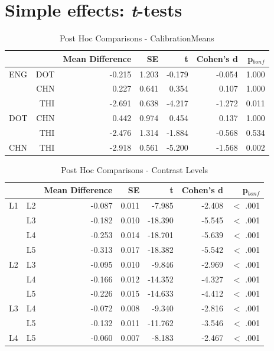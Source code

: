 \section{Simple effects: \textit{t}-tests}
\label{Appendix:ttests}

\begin{table}[ht]
	\centering
	\caption{Post Hoc Comparisons - CalibrationMeans}
	\begin{tabular}{lrrrrrr}
		\hline
		 &  & Mean Difference & SE & t & Cohen's d & p$_{bonf}$  \\
		\hline
		ENG & DOT & -0.215 & 1.203 & -0.179 & -0.054 & 1.000  \\
		  & CHN & 0.227 & 0.641 & 0.354 & 0.107 & 1.000  \\
		 & THI & -2.691 & 0.638 & -4.217 & -1.272 & 0.011  \\
		DOT & CHN & 0.442 & 0.974 & 0.454 & 0.137 & 1.000  \\
		  & THI & -2.476 & 1.314 & -1.884 & -0.568 & 0.534  \\
		CHN & THI & -2.918 & 0.561 & -5.200 & -1.568 & 0.002  \\
		\hline
	\end{tabular} 
	\label{tab:ttest_CalibrationMean_Cross}
\end{table}

\begin{table}[ht]
	\centering
	\caption{Post Hoc Comparisons - Contrast Levels}
	\begin{tabular}{lrrrrrr}
		\hline
		 &  & Mean Difference & SE & t & Cohen's d & p$_{bonf}$  \\
		\hline
		L1 & L2 & -0.087 & 0.011 & -7.985 & -2.408 & $<$ .001  \\
		  & L3 & -0.182 & 0.010 & -18.390 & -5.545 & $<$ .001  \\
		 & L4 & -0.253 & 0.014 & -18.701 & -5.639 & $<$ .001  \\
		 & L5 & -0.313 & 0.017 & -18.382 & -5.542 & $<$ .001  \\
		L2 & L3 & -0.095 & 0.010 & -9.846 & -2.969 & $<$ .001  \\
		  & L4 & -0.166 & 0.012 & -14.352 & -4.327 & $<$ .001  \\
		 & L5 & -0.226 & 0.015 & -14.633 & -4.412 & $<$ .001  \\
		L3 & L4 & -0.072 & 0.008 & -9.340 & -2.816 & $<$ .001  \\
		  & L5 & -0.132 & 0.011 & -11.762 & -3.546 & $<$ .001  \\
		L4 & L5 & -0.060 & 0.007 & -8.183 & -2.467 & $<$ .001  \\
		\hline
	\end{tabular} 
	\label{tab:LevelCompare_Cross}
\end{table}

